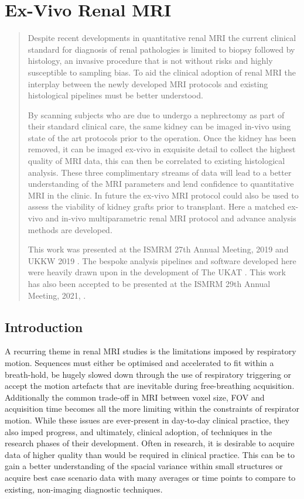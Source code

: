 \chapter{Ex-Vivo Renal MRI}
\label{chap:ex}
\newpage
\begin{abstract}
	Despite recent developments in quantitative renal \ac{MRI} the current clinical standard for diagnosis of renal pathologies is limited to biopsy followed by histology, an invasive procedure that is not without risks and highly susceptible to sampling bias. To aid the clinical adoption of renal \ac{MRI} the interplay between the newly developed \ac{MRI} protocols and existing histological pipelines must be better understood.	
	
	By scanning subjects who are due to undergo a nephrectomy as part of their standard clinical care, the same kidney can be imaged in-vivo using state of the art protocols prior to the operation. Once the kidney has been removed, it can be imaged ex-vivo in exquisite detail to collect the highest quality of \ac{MRI} data, this can then be correlated to existing histological analysis. These three complimentary streams of data will lead to a better understanding of the \ac{MRI} parameters and lend confidence to quantitative \ac{MRI} in the clinic. In future the ex-vivo \ac{MRI} protocol could also be used to assess the viability of kidney grafts prior to transplant. Here a matched ex-vivo and in-vivo multiparametric renal \ac{MRI} protocol and advance analysis methods are developed.
	
	This work was presented at the \ac{ISMRM} 27th Annual Meeting, 2019 \cite{daniel_effects_2019} and \ac{UKKW} 2019 \cite{kazmi_determining_2019-1}. The bespoke analysis pipelines and software developed here were heavily drawn upon in the development of The \ac{UKAT} \cite{nery_ukrin_2020}. This work has also been accepted to be presented at the \ac{ISMRM} 29th Annual Meeting, 2021, \cite{daniel_ukrin_2021}.
\end{abstract}
\acresetall
\newpage
\section{Introduction}

A recurring theme in renal \ac{MRI} studies is the limitations imposed by respiratory motion. Sequences must either be optimised and accelerated to fit within a breath-hold, be hugely slowed down through the use of respiratory triggering or accept the motion artefacts that are inevitable during free-breathing acquisition. Additionally the common trade-off in \ac{MRI} between voxel size, \ac{FOV} and acquisition time becomes all the more limiting within the constraints of respirator motion. While these issues are ever-present in day-to-day clinical practice, they also imped progress, and ultimately, clinical adoption, of techniques in the research phases of their development. Often in research, it is desirable to acquire data of higher quality than would be required in clinical practice. This can be to gain a better understanding of the spacial variance within small structures or acquire best case scenario data with many averages or time points to compare to existing, non-imaging diagnostic techniques.


